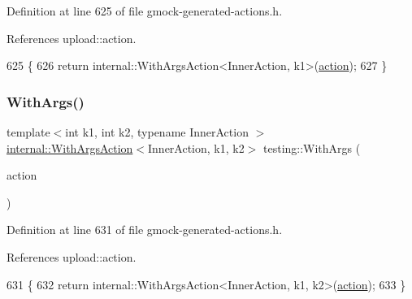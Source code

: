 Definition at line 625 of file gmock-\/generated-\/actions.\+h.



References upload\+::action.


\begin{DoxyCode}
625                                     \{
626   \textcolor{keywordflow}{return} internal::WithArgsAction<InnerAction, k1>(\hyperlink{namespaceupload_a675d13c979f1c720866d22ed1736f580}{action});
627 \}
\end{DoxyCode}
\mbox{\label{namespacetesting_aa82fc09250ba172220e6fb7e77249e74}} 
\subsubsection{\texorpdfstring{With\+Args()}{WithArgs()}\hspace{0.1cm}{\footnotesize\ttfamily [2/10]}}
{\footnotesize\ttfamily template$<$int k1, int k2, typename Inner\+Action $>$ \\
\hyperlink{classtesting_1_1internal_1_1WithArgsAction}{internal\+::\+With\+Args\+Action}$<$Inner\+Action, k1, k2$>$ testing\+::\+With\+Args (\begin{DoxyParamCaption}\item[{const Inner\+Action \&}]{action }\end{DoxyParamCaption})\hspace{0.3cm}{\ttfamily [inline]}}



Definition at line 631 of file gmock-\/generated-\/actions.\+h.



References upload\+::action.


\begin{DoxyCode}
631                                     \{
632   \textcolor{keywordflow}{return} internal::WithArgsAction<InnerAction, k1, k2>(\hyperlink{namespaceupload_a675d13c979f1c720866d22ed1736f580}{action});
633 \}
\end{DoxyCode}
\mbox{\label{namespacetesting_a999614cb785165b9a44a9a95a3753407}} 
